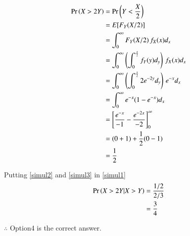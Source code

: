 \documentclass[journal,12pt,twocolumn]{IEEEtran}
\begin{document}
\begin{align}
    \Pr\left(X>2Y\right) &= \Pr\left(Y<\frac{X}{2}\right)\\
              &= E[F_Y(X/2)]\\
              &= \int_0^\infty F_Y(X/2)\,f_X(x) d_x\\
              &= \int_0^\infty \left(\int_{0}^{\frac{x}{2}} f_Y(y)d_y\right)\,f_X(x)d_x \\
              &= \int_{0}^{\infty}\left(\int_{0}^{\frac{x}{2}} 2e^{-2y}d_y\right)\,e^{-x}d_x \\
              &= \int_{0}^{\infty} e^{-x}(1-e^{-x})d_x\\
              &= \left[\frac{e^{-x}}{-1} - \frac{e^{-2x}}{-2}\right]_0^\infty\\
              &= (0+1) + \frac{1}{2}(0-1)\\
              &= \frac{1}{2} \label{simul3}
\end{align}

Putting \eqref{simul2} and \eqref{simul3} in \eqref{simul1}
\begin{align}
    \Pr\left(X>2Y|X>Y\right) &= \frac{1/2}{2/3}\\
                  &= \frac{3}{4}
\end{align}

$\therefore$ Option4 is the correct answer.
\end{document}
